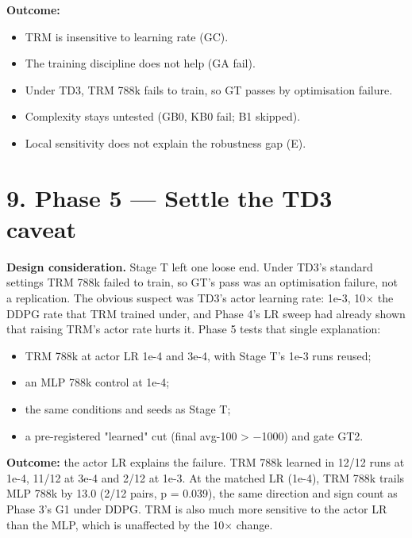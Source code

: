 \documentclass[11pt]{article}
\begin{document}
\textbf{Outcome:}

\begin{itemize}
\item TRM is insensitive to learning rate (GC).
\item The training discipline does not help (GA fail).
\item Under TD3, TRM 788k fails to train, so GT passes by optimisation failure.
\item Complexity stays untested (GB0, KB0 fail; B1 skipped).
\item Local sensitivity does not explain the robustness gap (E).
\end{itemize}



\section*{9. Phase 5 --- Settle the TD3 caveat}



\textbf{Design consideration.} Stage T left one loose end. Under TD3's standard settings TRM 788k failed to train, so GT's pass was an optimisation failure, not a replication. The obvious suspect was TD3's actor learning rate: 1e-3, 10$\times$ the DDPG rate that TRM trained under, and Phase 4's LR sweep had already shown that raising TRM's actor rate hurts it. Phase 5 tests that single explanation:

\begin{itemize}
\item TRM 788k at actor LR 1e-4 and 3e-4, with Stage T's 1e-3 runs reused;
\item an MLP 788k control at 1e-4;
\item the same conditions and seeds as Stage T;
\item a pre-registered "learned" cut (final avg-100 > $-$1000) and gate GT2.
\end{itemize}



\textbf{Outcome:} the actor LR explains the failure. TRM 788k learned in 12/12 runs at 1e-4, 11/12 at 3e-4 and 2/12 at 1e-3. At the matched LR (1e-4), TRM 788k trails MLP 788k by 13.0 (2/12 pairs, p = 0.039), the same direction and sign count as Phase 3's G1 under DDPG. TRM is also much more sensitive to the actor LR than the MLP, which is unaffected by the 10$\times$ change.
\end{document}

